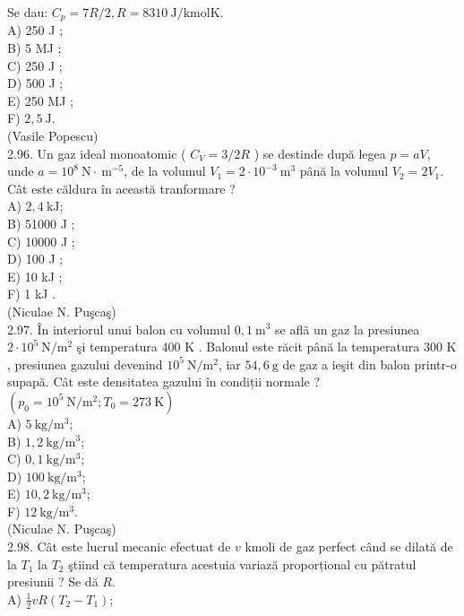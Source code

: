 Se dau: $C_{p}=7 R / 2, R=8310 \mathrm{~J} / \mathrm{kmol} \mathrm{K}$.\\
A) 250 J ;\\
B) 5 MJ ;\\
C) 250 J ;\\
D) 500 J ;\\
E) 250 MJ ;\\
F) $2,5 \mathrm{~J}$.\\
(Vasile Popescu)\\
2.96. Un gaz ideal monoatomic ( $C_{V}=3 / 2 R$ ) se destinde după legea $p=a V$, unde $a=10^{8} \mathrm{~N} \cdot \mathrm{~m}^{-5}$, de la volumul $V_{1}=2 \cdot 10^{-3} \mathrm{~m}^{3}$ până la volumul $V_{2}=2 V_{1}$. Cât este căldura în această tranformare ?\\
A) $2,4 \mathrm{~kJ}$;\\
B) 51000 J ;\\
C) 10000 J ;\\
D) 100 J ;\\
E) 10 kJ ;\\
F) 1 kJ .\\
(Niculae N. Puşcaş)\\
2.97. În interiorul unui balon cu volumul $0,1 \mathrm{~m}^{3}$ se aflã un gaz la presiunea $2 \cdot 10^{5} \mathrm{~N} / \mathrm{m}^{2}$ şi temperatura 400 K . Balonul este răcit până la temperatura 300 K , presiunea gazului devenind $10^{5} \mathrm{~N} / \mathrm{m}^{2}$, iar $54,6 \mathrm{~g}$ de gaz a ieşit din balon printr-o supapă. Cât este densitatea gazului în condiții normale ?\\
$\left(p_{0}=10^{5} \mathrm{~N} / \mathrm{m}^{2} ; T_{0}=273 \mathrm{~K}\right)$\\
A) $5 \mathrm{~kg} / \mathrm{m}^{3}$;\\
B) $1,2 \mathrm{~kg} / \mathrm{m}^{3}$;\\
C) $0,1 \mathrm{~kg} / \mathrm{m}^{3}$;\\
D) $100 \mathrm{~kg} / \mathrm{m}^{3}$;\\
E) $10,2 \mathrm{~kg} / \mathrm{m}^{3}$;\\
F) $12 \mathrm{~kg} / \mathrm{m}^{3}$.\\
(Niculae N. Puşcaş)\\
2.98. Cât este lucrul mecanic efectuat de $v$ kmoli de gaz perfect când se dilată de la $T_{1}$ la $T_{2}$ ştiind că temperatura acestuia variază proporțional cu pătratul presiunii ? Se dă $R$.\\
A) $\frac{1}{2} v R\left(T_{2}-T_{1}\right)$;\\
